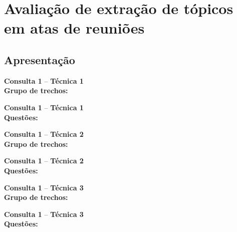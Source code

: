 \documentclass{article}
\newcommand{\resultsheader}[2] {
	\noindent \textbf{Consulta #1} -- \textbf{Técnica #2}
	 \vspace{0.5 cm} \\
	
}
\begin{document}
\pagestyle{empty}

\section*{Avaliação de extração de tópicos em atas de reuniões}
\vspace{1cm}


\subsection*{Apresentação}



\newpage \resultsheader{1}{1} \noindent \textbf{Grupo de trechos:}
 
\newpage \resultsheader{1}{1}  \noindent \textbf{Questões:}


\newpage \resultsheader{1}{2} \noindent \textbf{Grupo de trechos:}
 	
\newpage  \resultsheader{1}{2} \noindent \textbf{Questões:}


\newpage \resultsheader{1}{3} \noindent \textbf{Grupo de trechos:}
 	
\newpage  \resultsheader{1}{3}  \noindent \textbf{Questões:}




%  
%  	
%  	
\end{document}
